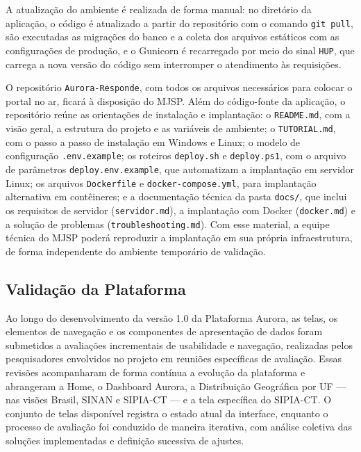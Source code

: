\documentclass[11pt,a4paper]{article}
\begin{document}
A atualização do ambiente é realizada de forma manual: no diretório da aplicação, o código é atualizado a partir do repositório com o comando \texttt{git pull}, são executadas as migrações do banco e a coleta dos arquivos estáticos com as configurações de produção, e o Gunicorn é recarregado por meio do sinal \texttt{HUP}, que carrega a nova versão do código sem interromper o atendimento às requisições.

O repositório \texttt{Aurora-Responde}, com todos os arquivos necessários para colocar o portal no ar, ficará à disposição do MJSP. Além do código-fonte da aplicação, o repositório reúne as orientações de instalação e implantação: o \texttt{README.md}, com a visão geral, a estrutura do projeto e as variáveis de ambiente; o \texttt{TUTORIAL.md}, com o passo a passo de instalação em Windows e Linux; o modelo de configuração \texttt{.env.example}; os roteiros \texttt{deploy.sh} e \texttt{deploy.ps1}, com o arquivo de parâmetros \texttt{deploy.env.example}, que automatizam a implantação em servidor Linux; os arquivos \texttt{Dockerfile} e \texttt{docker-compose.yml}, para implantação alternativa em contêineres; e a documentação técnica da pasta \texttt{docs/}, que inclui os requisitos de servidor (\texttt{servidor.md}), a implantação com Docker (\texttt{docker.md}) e a solução de problemas (\texttt{troubleshooting.md}). Com esse material, a equipe técnica do MJSP poderá reproduzir a implantação em sua própria infraestrutura, de forma independente do ambiente temporário de validação.


\subsection{Validação da Plataforma}
\label{subsec:criterios_aceite}

Ao longo do desenvolvimento da versão 1.0  da Plataforma Aurora, as telas, os elementos de navegação e os componentes de apresentação de dados foram submetidos a avaliações incrementais de usabilidade e navegação, realizadas pelos pesquisadores envolvidos no projeto em reuniões específicas de avaliação. Essas revisões acompanharam de forma contínua a evolução da plataforma e abrangeram a Home, o Dashboard Aurora, a Distribuição Geográfica por UF — nas visões Brasil, SINAN e SIPIA-CT — e a tela específica do SIPIA-CT. O conjunto de telas disponível registra o estado atual da interface, enquanto o processo de avaliação foi conduzido de maneira iterativa, com análise coletiva das soluções implementadas e definição sucessiva de ajustes.
\end{document}
